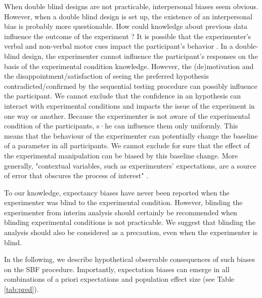 \documentclass[a4paper,man,natbib,floatsintext,donotrepeattitle]{apa6}
\begin{document}
When double blind designs are not practicable, interpersonal biases seem obvious. However, when a double blind design is set up, the existence of an interpersonal bias is probably more questionable. How could knowledge about previous data influence the outcome of the experiment ? It is possible that the experimenter's verbal and non-verbal motor cues impact the participant's behavior \citep{zoble_interaction_1969}. In a double-blind design, the experimenter cannot influence the participant's responses on the basis of the experimental condition knowledge. However, the (de)motivation and the disappointment/satisfaction of seeing the preferred hypothesis contradicted/confirmed by the sequential testing procedure can possibly influence the participant. We cannot exclude that the confidence in an hypothesis can interact with experimental conditions and impacts the issue of the experiment in one way or another. Because the experimenter is not aware of the experimental condition of the participants, s·he can influence them only uniformly. This means that the behaviour of the experimenter can potentially change the baseline of a parameter in all participants. We cannot exclude for sure that the effect of the experimental manipulation can be biased by this baseline change. More generally, "contextual variables, such as experimenters’ expectations, are a source of error that obscures the process of interest" \citep{klein_low_2012}.\par

To our knowledge, expectancy biases have never been reported when the experimenter was blind to the experimental condition. However, blinding the experimenter from interim analysis should certainly be recommended \citep{lakens_performing_2014} when blinding experimental conditions is not practicable. We suggest that blinding the analysis should also be considered as a precaution, even when the experimenter is blind.

In the following, we describe hypothetical observable consequences of such biases on the SBF procedure. Importantly, expectation biases can emerge in all combinations of a priori expectations and population effect size (see Table \ref{tab:pred}).

\vspace{5mm}
\end{document}
